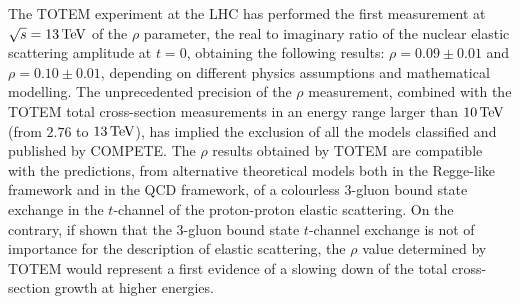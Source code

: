 The TOTEM experiment at the LHC has performed the first measurement at $\sqrt s = 13\,{\rm TeV}$ of the $\rho$ parameter, the real to imaginary ratio of the nuclear elastic scattering amplitude at $t=0$, obtaining the following results: $\rho = 0.09 \pm 0.01$ and $\rho = 0.10 \pm 0.01$, depending on different physics assumptions and mathematical modelling. The unprecedented precision of the $\rho$ measurement, combined with the TOTEM total cross-section measurements in an energy range larger than $10\,{\rm TeV}$ (from $2.76$ to $13\,{\rm TeV}$), has implied the exclusion of all the models classified and published by COMPETE. The $\rho$ results obtained by TOTEM are compatible with the predictions, from alternative theoretical models both in the Regge-like framework and in the QCD framework, of a colourless 3-gluon bound state exchange in the $t$-channel of the proton-proton elastic scattering. On the contrary, if shown that the 3-gluon bound state $t$-channel exchange is not of importance for the description of elastic scattering, the $\rho$ value determined by TOTEM would represent a first evidence of a slowing down of the total cross-section growth at higher energies.
